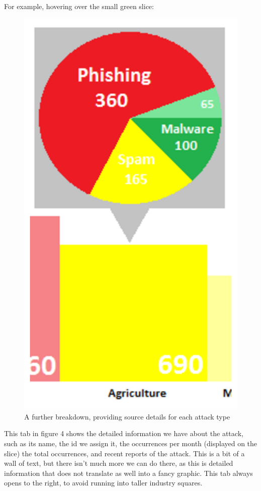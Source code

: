 \documentclass[journal]{vgtc}                %
\begin{document}
For example, hovering over the small green slice: 
\begin{figure}[tb]
 \centering %
 \includegraphics[width=\columnwidth]{Design3}
 \caption{A further breakdown, providing source details for each attack type}
 \label{fig:sample}
\end{figure}
This tab in figure 4 shows the detailed information we have about the attack, such as its name, the id we assign it, the occurrences per month (displayed on the slice) the total occurrences, and recent reports of the attack. 
This is a bit of a wall of text, but there isn’t much more we can do there, as this is detailed information that does not translate as well into a fancy graphic. 
This tab always opens to the right, to avoid running into taller industry squares.
\end{document}
